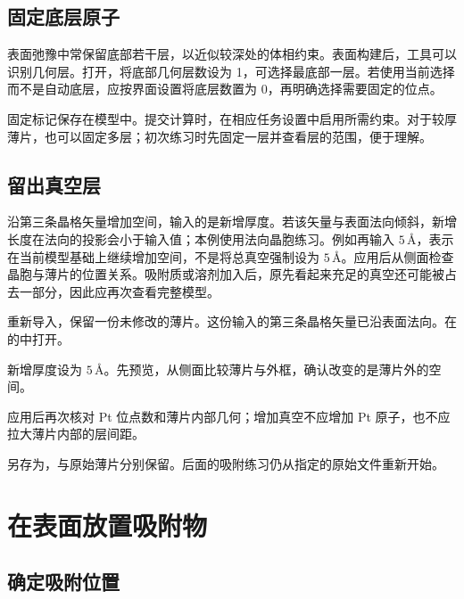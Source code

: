 \subsection{固定底层原子}

表面弛豫中常保留底部若干层，以近似较深处的体相约束。表面构建后，工具可以识别几何层。打开，将底部几何层数设为 1，可选择最底部一层。若使用当前选择而不是自动底层，应按界面设置将底层数置为 0，再明确选择需要固定的位点。

固定标记保存在模型中。提交计算时，在相应任务设置中启用所需约束。对于较厚薄片，也可以固定多层；初次练习时先固定一层并查看层的范围，便于理解。

\subsection{留出真空层}

沿第三条晶格矢量增加空间，输入的是新增厚度。若该矢量与表面法向倾斜，新增长度在法向的投影会小于输入值；本例使用法向晶胞练习。例如再输入 $5\,\text{\AA}$，表示在当前模型基础上继续增加空间，不是将总真空强制设为 $5\,\text{\AA}$。应用后从侧面检查晶胞与薄片的位置关系。吸附质或溶剂加入后，原先看起来充足的真空还可能被占去一部分，因此应再次查看完整模型。



\begin{steps}
  \item 重新导入，保留一份未修改的薄片。这份输入的第三条晶格矢量已沿表面法向。在的中打开。
  \item 新增厚度设为 $5\,\text{\AA}$。先预览，从侧面比较薄片与外框，确认改变的是薄片外的空间。
  \item 应用后再次核对 Pt 位点数和薄片内部几何；增加真空不应增加 Pt 原子，也不应拉大薄片内部的层间距。
  \item 另存为，与原始薄片分别保留。后面的吸附练习仍从指定的原始文件重新开始。
\end{steps}



\section{在表面放置吸附物}

\subsection{确定吸附位置}

